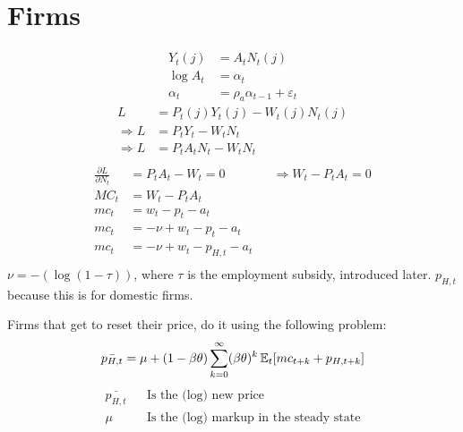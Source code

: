 \documentclass[12pt]{article}
\begin{document}
\section{Firms}
\begin{align}
    Y_t(j)   & = A_t N_t(j)                          \\
    \log A_t & = \alpha_t                            \\
    \alpha_t & = \rho_a \alpha_{t-1} + \varepsilon_t
\end{align}
\begin{align}
    L             & =P_{t}(j)Y_{t}(j) - W_t(j)N_{t}(j) \\
    \Rightarrow L & =P_{t}Y_{t} - W_tN_{t}             \\
    \Rightarrow L & =P_{t}A_t N_t - W_tN_{t}           \\
\end{align}
\begin{align}
    \frac{\partial L}{\partial N_t} & = P_t A_t - W_t = 0          &  & \Rightarrow W_t - P_tA_t = 0 \\
    MC_t                            & = W_t - P_tA_t                                                 \\
    mc_t                            & = w_t - p_t - a_t                                              \\
    mc_t                            & = -\nu + w_t - p_t - a_t                                       \\
    mc_t                            & = -\nu + w_t - p_{H,t} - a_t                                   \\
\end{align}
$\nu=-(\log (1-\tau))$, where $\tau$ is the employment subsidy, introduced later. $p_{H,t}$ because this is for domestic firms.

Firms that get to reset their price, do it using the following problem:
\begin{equation}
    \bar{p_{H,t}} = \mu + (1-\beta \theta) \sum_{k=0}^{\infty} (\beta \theta)^{k} \operatorname{\mathbb{E}}_t [mc_{t+k} + p_{H,t+k}]
\end{equation}
\begin{align}
    \bar{p_{H,t}} &  & \text{Is the (log) new price}                  \\
    \mu           &  & \text{Is the (log) markup in the steady state}
\end{align}
\end{document}

